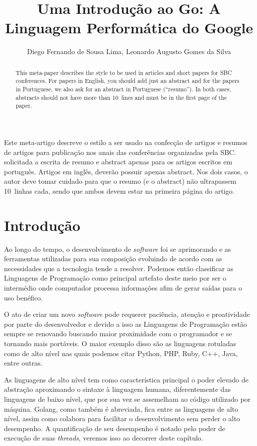 \documentclass{SBCbookchapter}
\author{Diego Fernando de Sousa Lima, Leonardo Augusto Gomes da Silva}
\title{Uma Introdução ao Go: A Linguagem Performática do Google}
\begin{document}
\maketitle

\begin{abstract}
	This meta-paper describes the style to be used in articles and short
	papers for SBC conferences. For papers in English, you should add just
	an abstract and for the papers in Portuguese, we also ask for an
	abstract in Portuguese (``resumo''). In both cases, abstracts should not
	have more than 10~lines and must be in the first page of the paper.
\end{abstract}

\begin{resumo}
	\begin{otherlanguage}{brazilian}
		Este meta-artigo descreve o estilo a ser usado na confecção de artigos
		e resumos de artigos para publicação nos anais das conferências
		organizadas pela SBC.  solicitada a escrita de resumo e abstract apenas
		para os artigos escritos em português. Artigos em inglês, deverão
		possuir apenas abstract. Nos dois casos, o autor deve tomar cuidado para
		que o resumo (e o abstract) não ultrapassem 10~linhas cada, sendo que
		ambos devem estar na primeira página do artigo.
	\end{otherlanguage}
\end{resumo}

\section{Introdução}

Ao longo do tempo, o desenvolvimento de \textit{software} foi se aprimorando e as ferramentas utilizadas para sua composição evoluindo de acordo com as necessidades que a tecnologia tende a resolver. Podemos então classificar as Linguagens de Programação como principal artefato deste meio por ser o intermédio onde computador processa informações afim de gerar saídas para o uso benéfico.

O ato de criar um novo \textit{software} pode requerer paciência, atenção e proatividade por parte do desenvolvedor e devido a isso as Linguagens de Programação estão sempre se renovando buscando maior proximidade com o programador e se tornando mais portáveis. O maior exemplo disso são as linguagens rotuladas como de alto nível nas quais podemos citar Python, PHP, Ruby, C++, Java, entre outras.

As linguagens de alto nível tem como característica principal o poder elevado de abstração aproximando o sintaxe à linguagem humana, diferentemente das linguagens de baixo nível, que por sua vez se assemelham ao código utilizado por máquina. Golang, como também é abreviada, fica entre as linguagens de alto nível, assim como colabora para facilitar o desenvolvimento sem perder o alto desempenho. A quantificação de seu desempenho é notado pelo poder de execução de suas \textit{threads}, veremos isso ao decorrer deste capítulo. 
\end{document}

